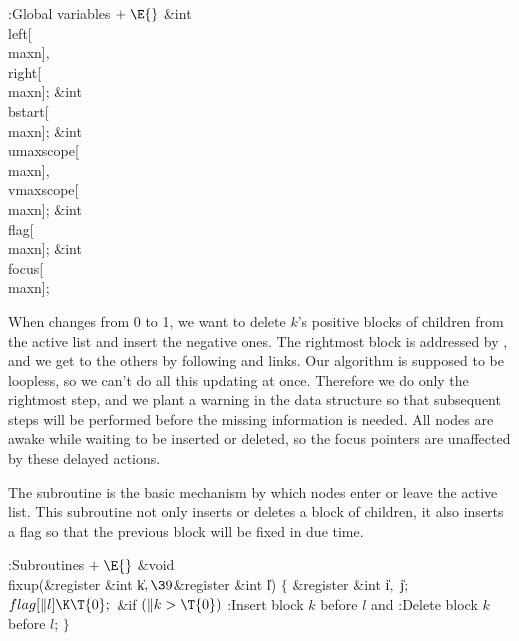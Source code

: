 \B{}:Global variables\X${}\mathrel+\E{}$\6
\&{int} \\{left}[\\{maxn}]${},{}$ \\{right}[\\{maxn}];\6
\&{int} \\{bstart}[\\{maxn}];\6
\&{int} \\{umaxscope}[\\{maxn}]${},{}$ \\{vmaxscope}[\\{maxn}];\6
\&{int} \\{flag}[\\{maxn}];\6
\&{int} \\{focus}[\\{maxn}];\par
\fi

When  changes from 0 to 1, we want to
delete $k$'s positive blocks of
children from the active list and insert the negative ones. The rightmost
block is addressed by , and we get to the others by
following
 and  links. Our algorithm is supposed to be
loopless, so we
can't do all this updating at once. Therefore we do only the rightmost step,
and we plant a warning in the data structure so that subsequent steps
will be performed before the missing information is needed. All nodes are
awake while waiting to be inserted or deleted, so the focus pointers are
unaffected by these delayed actions.

The  subroutine is the basic mechanism by which nodes
enter or leave the active list. This subroutine not only inserts
or deletes a block of children, it also inserts a flag so that
the previous block will be fixed in due time.

\Y\B\4:Subroutines\X${}\mathrel+\E{}$\6
\&{void} \\{fixup}(\&{register} \&{int} \|k${},\39{}$\&{register} \&{int} \|l)%
\1\1\2\2\6
${}\{{}$\1\6
\&{register} \&{int} \|i${},{}$ \|j;\7
${}\\{flag}[\|l]\K\T{0};{}$\6
\&{if} ${}(\|k>\T{0}){}$\1\5
:Insert block $k$ before $l$ and \X\2\6
:Delete block $k$ before $l$\X;\6
\4${}\}{}$\2\par
\fi

